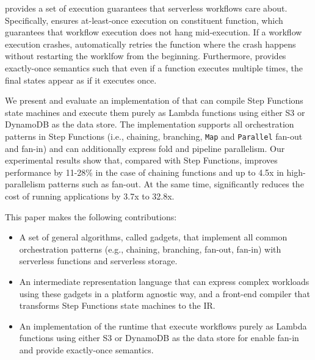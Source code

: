 \name{} provides a set of execution guarantees that serverless workflows care
about. Specifically, \name{} ensures at-least-once execution on constituent
function, which guarantees that workflow execution does not hang
mid-execution. If a workflow execution crashes, \name{} automatically retries
the function where the crash happens without restarting the worklfow from the
beginning. Furthermore, \name{} provides exactly-once semantics such that even
if a function executes multiple times, the final states appear as if it
executes once.

We present and evaluate an implementation of \name{} that can compile Step
Functions state machines and execute them purely as Lambda functions using
either S3 or DynamoDB as the data store. The implementation supports all
orchestration patterns in Step Functions (i.e., chaining, branching,
\texttt{Map} and \texttt{Parallel} fan-out and fan-in) and can additionally
express fold and pipeline parallelism. Our experimental results show that,
compared with Step Functions, \name{} improves performance by 11-28\% in the
case of chaining functions and up to 4.5x in high-parallelism patterns such as
fan-out. At the same time, \name{} significantly reduces the cost of running
applications by 3.7x to 32.8x.

This paper makes the following contributions:

\begin{itemize}

  \item A set of general algorithms, called gadgets, that implement all common
  orchestration patterns (e.g., chaining, branching, fan-out, fan-in) with
  serverless functions and serverless storage.

  \item An intermediate representation language that can express complex
  workloads using these gadgets in a platform agnostic way, and a front-end
  compiler that transforms Step Functions state machines to the IR.

  \item An implementation of the \name{} runtime that execute workflows purely
  as Lambda functions using either S3 or DynamoDB as the data store for enable
  fan-in and provide exactly-once semantics.

\end{itemize}

